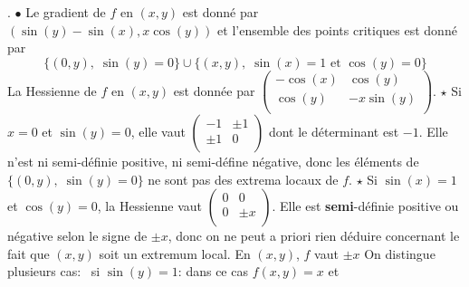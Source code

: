 \documentclass{report}
\begin{document}
\subsection{} \noindent{}\\ 
\\ 
\\
. $\bullet$ Le gradient de $f$ en $(x,y)$ est donné par $\left( \sin(y) - \sin(x), x\cos(y)\right)$ et l'ensemble des points critiques est donné par $$ \{(0,y), \; \sin(y)=0\} \cup \{(x,y),\;\sin(x)=1 \text{ et } \cos(y)=0 \} $$
La Hessienne de $f$ en $(x,y)$ est donnée par $\left(
\begin{array}{cc}
 -\cos (x) & \cos (y) \\
 \cos (y) & -x \sin (y) \\
\end{array}
\right)$.\newline 
\newline
$\star$ Si $x=0$ et $\sin(y)=0$, elle vaut $\left(\begin{array}{cc}
 -1 & \pm 1 \\
\pm 1 & 0 \\
\end{array}\right)$ dont le déterminant est $-1$. Elle n'est ni semi-définie positive, ni semi-défine négative, donc les éléments de $\{(0,y), \; \sin(y)=0\}$ ne sont pas des extrema locaux de $f$. \newline
$\star$ Si $\sin(x)=1$ et $\cos(y)=0$, la Hessienne vaut $\left(\begin{array}{cc}
 0 & 0 \\
0 & \pm x \\
\end{array}\right)$. Elle est \textbf{semi}-définie positive ou négative selon le signe de $\pm x$, donc on ne peut a priori rien déduire concernant le fait que $(x,y)$ soit un extremum local.
En $(x,y)$, $f$ vaut $\pm x$ On distingue plusieurs cas: \newline
\textopenbullet \, si $\sin(y)=1$: dans ce cas $f(x,y)=x$ et \newline
\end{document}
